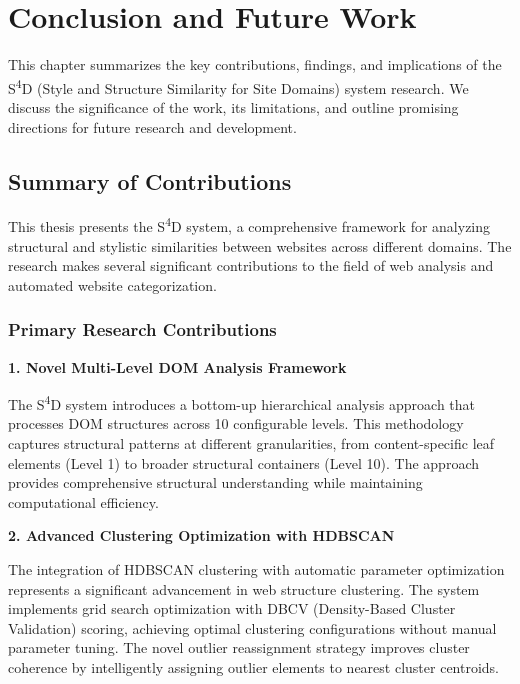 \chapter{Conclusion and Future Work}
\label{ch:conclusion}

This chapter summarizes the key contributions, findings, and implications of the S\textsuperscript{4}D (Style and Structure Similarity for Site Domains) system research. We discuss the significance of the work, its limitations, and outline promising directions for future research and development.

\section{Summary of Contributions}
\label{sec:summary-contributions}

This thesis presents the S\textsuperscript{4}D system, a comprehensive framework for analyzing structural and stylistic similarities between websites across different domains. The research makes several significant contributions to the field of web analysis and automated website categorization.

\subsection{Primary Research Contributions}
\label{subsec:primary-contributions}

\textbf{1. Novel Multi-Level DOM Analysis Framework}

The S\textsuperscript{4}D system introduces a bottom-up hierarchical analysis approach that processes DOM structures across 10 configurable levels. This methodology captures structural patterns at different granularities, from content-specific leaf elements (Level 1) to broader structural containers (Level 10). The approach provides comprehensive structural understanding while maintaining computational efficiency.

\textbf{2. Advanced Clustering Optimization with HDBSCAN}

The integration of HDBSCAN clustering with automatic parameter optimization represents a significant advancement in web structure clustering. The system implements grid search optimization with DBCV (Density-Based Cluster Validation) scoring, achieving optimal clustering configurations without manual parameter tuning. The novel outlier reassignment strategy improves cluster coherence by intelligently assigning outlier elements to nearest cluster centroids.

